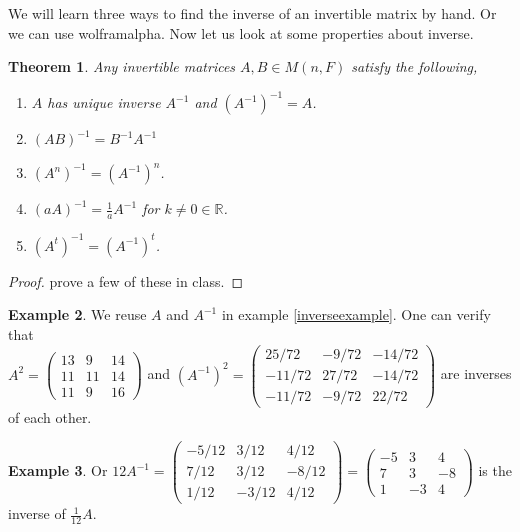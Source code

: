 \documentclass[12pt]{amsart}
\newtheorem{theorem}{Theorem}[section]
\theoremstyle{definition}
\newtheorem{example}[theorem]{Example}
\begin{document}
We will learn three ways to find the inverse of an invertible matrix by hand. Or we can use wolframalpha. Now let us look at some properties about inverse.

\begin{theorem} Any invertible matrices $A, B \in M(n, F)$ satisfy the following,
\begin{enumerate}[\indent 1.]
\item $A$ has unique inverse $A^{-1}$ and $(A^{-1})^{-1} = A$.
\item $(AB)^{-1} = B^{-1}A^{-1}$
\item $(A^n)^{-1} = (A^{-1})^n$.
\item $(a A)^{-1} = \frac{1}{a}A^{-1}$ for $k \neq 0 \in \mathbb{R}$.
\item $(A^t)^{-1} = (A^{-1})^t$.
\end{enumerate}
\end{theorem}
\begin{proof} prove a few of these in class.
\end{proof}

\begin{example} We reuse $A$ and $A^{-1}$ in example \ref{inverseexample}. One can verify that\\
$A^2 = \left(\begin{array}{ccc} 13 & 9 & 14 \\ 11 & 11 & 14 \\ 11 & 9 &16 \end{array}\right)$ and $(A^{-1})^2 = \left(\begin{array}{ccc} 25/72 & -9/72 & -14/72 \\ -11/72 & 27/72 & -14/72 \\ -11/72 & -9/72 & 22/72 \end{array}\right)$ are inverses of each other.
\end{example}

\begin{example} Or $12A^{-1} = \left(\begin{array}{ccc} -5/12 & 3/12 & 4/12\\ 7/12 & 3/12 & -8/12 \\ 1/12 & -3/12 & 4/12 \end{array}\right) = \left(\begin{array}{ccc} -5 & 3 & 4\\ 7 & 3 & -8 \\ 1 & -3 & 4 \end{array}\right)$ is the inverse of $\frac{1}{12}A$.
\end{example}
\end{document}
